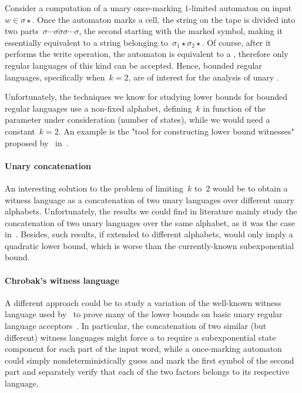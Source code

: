 Consider a computation of a unary once-marking $1$-limited automaton on input~$w\in\sigma\star$.
Once the automaton marks a cell, the string on the tape is divided into two parts~$\sigma\cdots\sigma \tilde\sigma \sigma\cdots\sigma$, the second starting with the marked symbol, making it essentially equivalent to a string belonging to~$\sigma_1\star\sigma_2\star$.
Of course, after it performs the write operation, the automaton is equivalent to a \TNFA, therefore only regular languages of this kind can be accepted.
Hence, bounded regular languages, specifically when~$k=2$, are of interest for the analysis of unary \OMOLAs.

Unfortunately, the techniques we know for studying lower bounds for bounded regular languages use a non-fixed alphabet, defining~$k$ in function of the parameter under consideration (number of states), while we would need a constant~$k=2$.
An example is the "tool for constructing lower bound witnesses" proposed by~\citeauthor{HerKut+17} in~\cite{HerKut+17}.

\paragraph{Unary concatenation} An interesting solution to the problem of limiting~$k$ to~$2$ would be to obtain a witness language as a concatenation of two unary languages over different unary alphabets.
Unfortunately, the results we could find in literature mainly study the concatenation of two unary languages over the same alphabet, as it was the case in~\cite{YuZhu+94,PigSha02}.
Besides, such results, if extended to different alphabets, would only imply a quadratic lower bound, which is worse than the currently-known subexponential bound.

\paragraph{Chrobak's witness language} A different approach could be to study a variation of the well-known witness language used by~\citeauthor{Chr86} to prove many of the lower bounds on basic unary regular language acceptors~\cite{Chr86}.
In particular, the concatenation of two similar (but different) witness languages might force a \ODFA to require a subexponential state component for each part of the input word, while a once-marking automaton could simply nondeterministically guess and mark the first symbol of the second part and separately verify that each of the two factors belongs to its respective language.


